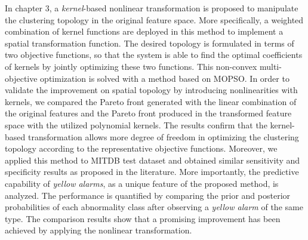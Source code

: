 In chapter 3, a \textit{kernel}-based nonlinear transformation is proposed to manipulate the clustering topology in the original feature space. More specifically, a weighted combination of kernel functions are deployed in this method to implement a spatial transformation function. The desired topology is formulated in terms of two objective functions, so that the system is able to find the optimal coefficients of kernels by jointly optimizing these two functions. This non-convex multi-objective optimization is solved with a method based on MOPSO. In order to validate the improvement on spatial topology by introducing nonlinearities with kernels, we compared the Pareto front generated with the linear combination of the original features and the Pareto front produced in the transformed feature space with the utilized polynomial kernels. The results confirm that the kernel-based transformation allows more degree of freedom in optimizing the clustering topology according to the representative objective functions. Moreover, we applied this method to MITDB test dataset and obtained similar sensitivity and specificity results as proposed in the literature. More importantly, the predictive capability of \textit{yellow alarms}, as a unique feature of the proposed method, is analyzed. The performance is quantified by comparing the prior and posterior probabilities of each abnormality class after observing a \textit{yellow alarm} of the same type. The comparison results show that a promising improvement has been achieved by applying the nonlinear transformation. 


